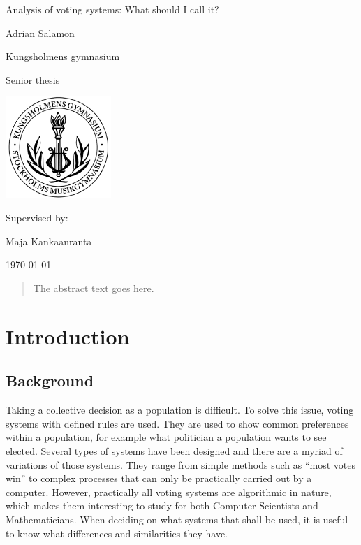 \documentclass[12pt]{article}
\begin{document}
\begin{titlepage}
	\centering
	\vspace{2cm}
	{\Huge Analysis of voting systems: What should I call it? \par}
	\vspace{0.6cm}
	{\LARGE Adrian Salamon\par}

	\vspace{0.6cm}
	{\Large Kungsholmens gymnasium\par}
	\vspace{0.4cm}
	{\large Senior thesis\par}
	\vspace{0.6cm}
	\includegraphics[width=0.3\textwidth]{kg}\par\vspace{1cm}
	\vspace{4cm}
	\vfill
	Supervised by: \par
	Maja Kankaanranta

	\vfill

	{\large \today\par}
\end{titlepage}

\pagebreak

\begin{abstract}
	The abstract text goes here.
\end{abstract}

\pagebreak

\tableofcontents

\pagebreak

\section{Introduction}
\subsection{Background}
Taking a collective decision as a population is difficult. To solve this issue, voting systems with defined rules are used. They are used to show common preferences within a population, for example what politician a population wants to see elected. Several types of systems have been designed and there are a myriad of variations of those systems. They range from simple methods such as “most votes win” to complex processes that can only be practically carried out by a computer. However, practically all voting systems are algorithmic in nature, which makes them interesting to study for both Computer Scientists and Mathematicians. When deciding on what systems that shall be used, it is useful to know what differences and similarities they have.
\end{document}
